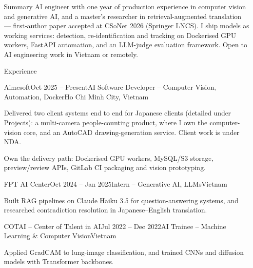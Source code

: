 \documentclass{resume} %
\begin{document}

\begin{rSection}{Summary}
AI engineer with one year of production experience in computer vision and generative AI, and a master's researcher in retrieval-augmented translation --- first-author paper accepted at CSoNet 2026 (Springer LNCS). I ship models as working services: detection, re-identification and tracking on Dockerised GPU workers, FastAPI automation, and an LLM-judge evaluation framework. Open to AI engineering work in Vietnam or remotely.
\end{rSection}


\begin{rSection}{Experience}

\begin{rSubsection}{Aimesoft}{Oct 2025 -- Present}{AI Software Developer -- Computer Vision, Automation, Docker}{Ho Chi Minh City, Vietnam}
\item Delivered two client systems end to end for Japanese clients (detailed under Projects): a multi-camera people-counting product, where I own the computer-vision core, and an AutoCAD drawing-generation service. Client work is under NDA.
\item Own the delivery path: Dockerised GPU workers, MySQL/S3 storage, preview/review APIs, GitLab CI packaging and vision prototyping.
\end{rSubsection}

\begin{rSubsection}{FPT AI Center}{Oct 2024 -- Jan 2025}{Intern -- Generative AI, LLMs}{Vietnam}
\item Built RAG pipelines on Claude Haiku 3.5 for question-answering systems, and researched contradiction resolution in Japanese--English translation.
\end{rSubsection}

\begin{rSubsection}{COTAI -- Center of Talent in AI}{Jul 2022 -- Dec 2022}{AI Trainee -- Machine Learning \& Computer Vision}{Vietnam}
\item Applied GradCAM to lung-image classification, and trained CNNs and diffusion models with Transformer backbones.
\end{rSubsection}

\end{rSection}
\end{document}
